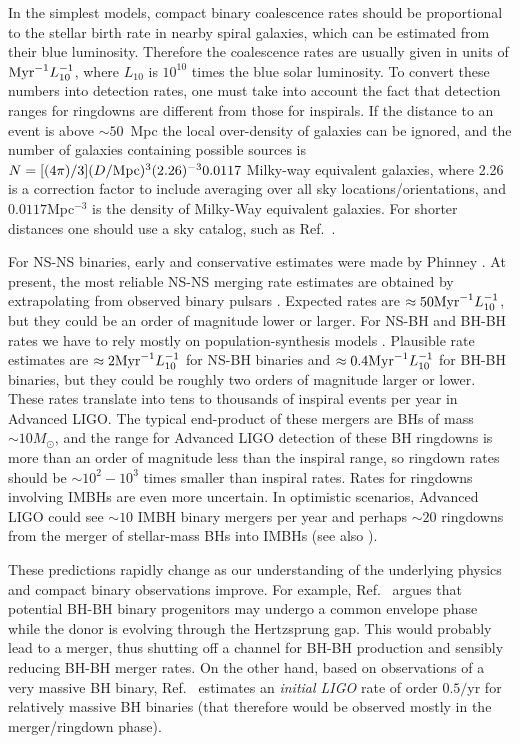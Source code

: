 \documentclass[]{iopart}
\begin{document}
In the simplest models, compact binary coalescence rates should be
proportional to the stellar birth rate in nearby spiral galaxies, which can be
estimated from their blue luminosity. Therefore the coalescence rates are
usually given in units of ${\rm Myr}^{-1}L_{10}^{-1}$, where $L_{10}$ is
$10^{10}$ times the blue solar luminosity. To convert these numbers into
detection rates, one must take into account the fact that detection ranges for
ringdowns are different from those for inspirals.  If the distance to an event
is above $\sim 50$~Mpc the local over-density of galaxies can be ignored, and
the number of galaxies containing possible sources is $N=[(4\pi)/3](D/{\rm
  Mpc})^3 (2.26)^{-3} 0.0117$ Milky-way equivalent galaxies, where 2.26 is a
correction factor to include averaging over all sky locations/orientations,
and $0.0117$Mpc$^{-3}$ is the density of Milky-Way equivalent galaxies.  For
shorter distances one should use a sky catalog, such as
Ref.~\cite{Kopparapu:2007ib}.

For NS-NS binaries, early and conservative estimates were made by Phinney
\cite{Phinney:1991ei}. At present, the most reliable NS-NS merging rate
estimates are obtained by extrapolating from observed binary pulsars
\cite{Kalogera:2003tn,Kalogera:2003tnErratum}. Expected rates are $\approx
50{\rm Myr}^{-1}L_{10}^{-1}$, but they could be an order of magnitude lower or
larger.  For NS-BH and BH-BH rates we have to rely mostly on
population-synthesis models \cite{O'Shaughnessy:2005qs,O'Shaughnessy:2006wh}.
Plausible rate estimates are $\approx 2{\rm Myr}^{-1}L_{10}^{-1}$ for NS-BH
binaries and $\approx 0.4{\rm Myr}^{-1}L_{10}^{-1}$ for BH-BH binaries, but
they could be roughly two orders of magnitude larger or lower. These rates
translate into tens to thousands of inspiral events per year in Advanced
LIGO. The typical end-product of these mergers are BHs of mass $\sim 10
M_\odot$, and the range for Advanced LIGO detection of these BH ringdowns is
more than an order of magnitude less than the inspiral range, so ringdown
rates should be $\sim 10^2-10^3$ times smaller than inspiral rates.
%
Rates for ringdowns involving IMBHs are even more uncertain. In optimistic
scenarios, Advanced LIGO could see $\sim 10$ IMBH binary mergers per year
\cite{Fregeau:2006yz} and perhaps $\sim 20$ ringdowns from the merger of
stellar-mass BHs into IMBHs \cite{Mandel:2007hi} (see also
\cite{Brown:2006pj,Mandel:2008bc}).

These predictions rapidly change as our understanding of the underlying
physics and compact binary observations improve. For example,
Ref.~\cite{Belczynski:2006zi} argues that potential BH-BH binary progenitors
may undergo a common envelope phase while the donor is evolving through the
Hertzsprung gap. This would probably lead to a merger, thus shutting off a
channel for BH-BH production and sensibly reducing BH-BH merger rates. 
On the other hand, based on observations of a very massive BH binary,
Ref.~\cite{Bulik:2008ab} estimates an {\em initial LIGO} rate of order
$0.5/$yr for relatively massive BH binaries (that therefore would be observed
mostly in the merger/ringdown phase).
\end{document}
